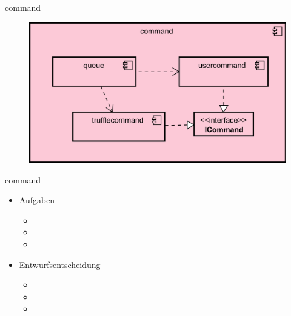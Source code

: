 \begin{frame}{command}
    \begin{figure}
    	\centering
    	\includegraphics[width=\textwidth]{./images/command.png}
    \end{figure}
\end{frame}

\begin{frame}{command}
    \begin{itemize}[<+->]
      \item Aufgaben
        \begin{itemize}
          \item 
          \item 
          \item 
        \end{itemize}
      \item Entwurfsentscheidung
        \begin{itemize}
          \item 
          \item 
          \item 
        \end{itemize}
    \end{itemize}
\end{frame}
